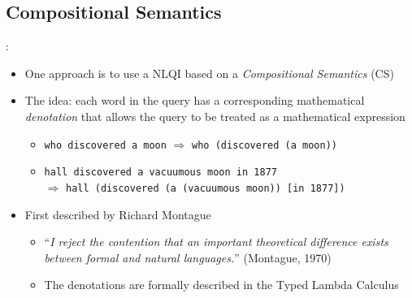 \documentclass[logoontitle,tabu,supertabular,aspectratio=43]{preney-uwindsor-beamer}
\begin{document}
    \subsection{Compositional Semantics}
    \begin{frame}{\insertsection: \insertsubsection}
        \begin{itemize}
            \item One approach is to use a NLQI based on a {\em Compositional Semantics} (CS)
            \item The idea: each word in the query has a corresponding mathematical {\em denotation} that allows the query to be treated as a mathematical expression
            \begin{itemize}
                \item \texttt{who discovered a moon} $\Rightarrow$ \texttt{who (discovered (a moon))}
                \item \texttt{hall discovered a vacuumous moon in 1877} \\ $\Rightarrow$ \texttt{hall (discovered (a (vacuumous moon)) [in 1877])}
            \end{itemize}
            \item First described by Richard Montague \cite{Dowty:wall}
            \begin{itemize}
                \item ``\textit{I reject the contention that an important theoretical difference exists between formal and natural languages.}'' (Montague, 1970)
                \item The denotations are formally described in the Typed Lambda Calculus
            \end{itemize}
        \end{itemize}
    \end{frame}
\end{document}

